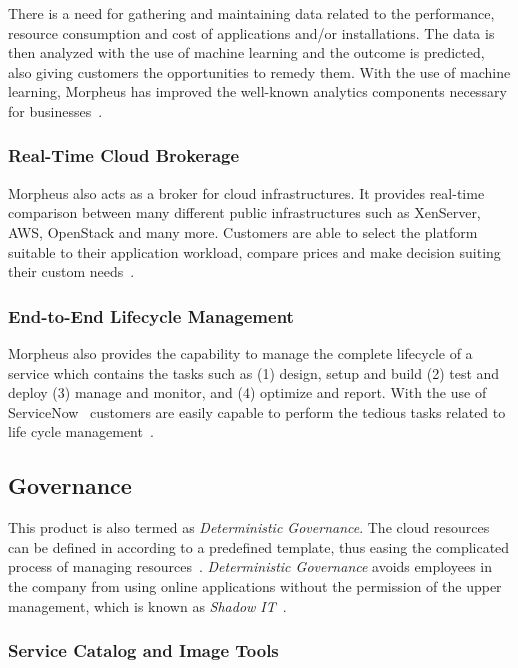 There is a need for gathering and maintaining data related to the performance,
resource consumption and cost of applications and/or installations. The data is
then analyzed with the use of machine learning and the outcome is predicted,
also giving customers the opportunities to remedy them. With the use of machine
learning, Morpheus has improved the well-known analytics components necessary
for businesses~\cite{hid-sp18-416-www-morpheus-analytics}.

\subsubsection{Real-Time Cloud Brokerage}

Morpheus also acts as a broker for cloud infrastructures. It provides real-time
comparison between many different public infrastructures such as XenServer,
AWS, OpenStack and many more. Customers are able to select the platform
suitable to their application workload, compare prices and make decision
suiting their custom needs~\cite{hid-sp18-416-www-morpheus-analytics}.

\subsubsection{End-to-End Lifecycle Management}

Morpheus also provides the capability to manage the complete lifecycle of a
service which contains the tasks such as (1) design, setup and build (2) test
and deploy (3) manage and monitor, and (4) optimize and report. With the use of
ServiceNow~\cite{hid-sp18-416-www-servicenow} customers are easily capable to
perform the tedious tasks related to life cycle
management~\cite{hid-sp18-416-www-morpheus-analytics}.

\subsection{Governance}

This product is also termed as \textit{Deterministic Governance}. The cloud
resources can be defined in according to a predefined template, thus easing the
complicated process of managing
resources~\cite{hid-sp18-416-www-morpheus-product-guide}. \textit{Deterministic
	Governance} avoids employees in the company from using online applications
without the permission of the upper management, which is known as
\textit{Shadow IT}~\cite{hid-sp18-416-www-shadowit-wikipedia}.

\subsubsection{Service Catalog and Image Tools}

